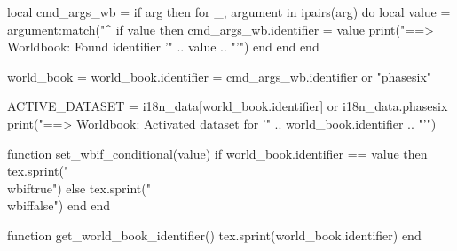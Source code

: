 \begin{luacode*}
local cmd_args_wb = {}
if arg then
    for _, argument in ipairs(arg) do
        local value = argument:match("^%
        if value then
            cmd_args_wb.identifier = value
            print("==> Worldbook: Found identifier '" .. value .. "'")
        end
    end
end

world_book = {}
world_book.identifier = cmd_args_wb.identifier or "phasesix"

ACTIVE_DATASET = i18n_data[world_book.identifier] or i18n_data.phasesix
print("==> Worldbook: Activated dataset for '" .. world_book.identifier .. "'")

function set_wbif_conditional(value)
    if world_book.identifier == value then
        tex.sprint("\\wbiftrue")
    else
        tex.sprint("\\wbiffalse")
    end
end

function get_world_book_identifier()
    tex.sprint(world_book.identifier)
end
\end{luacode*}


\newcommand{\wbidentifier}{\directlua{get_world_book_identifier()}}

\newif\ifwbif

\newcommand{\wbif}[3]{
    \directlua{set_wbif_conditional("#1")}
    \ifwbif
        #2
    \else
        #3
    \fi
}
